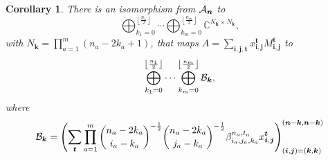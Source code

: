 \documentclass[final,onecolumn]{IEEEtran}
\newtheorem{corollaryenv}[definitionenv]{Corollary}
\newenvironment{corollary}{\begin{corollaryenv}\rm}{\end{corollaryenv}}
\theoremstyle{definition}
\newcommand{\bmi}{{\bm i}}
\newcommand{\bmj}{{\bm j}}
\newcommand{\bmn}{{\bm n}}
\newcommand{\bmk}{{\bm k}}
\newcommand{\bmt}{{\bm t}}
\begin{document}
	
\begin{corollary} \label{cor:blo_g}
	There is an isomorphism from ${\cal A}_{\bmn}$  to
	\begin{equation*}
		\bigoplus_{k_{1} = 0}^{\left\lfloor \frac{n_{1}}{2} \right\rfloor} \cdots \bigoplus_{k_{m} = 0}^{\left\lfloor \frac{n_{m}}{2} \right\rfloor} \mathbb{C}^{N_{\bmk} \times N_{\bmk}}, 
	\end{equation*}
	with $N_{\bmk} = \prod_{a = 1}^{m} (n_{a}-2k_{a}+1)$, that maps
	$A = \sum_{\bmi, \bmj, \bmt}x_{\bmi, \bmj}^{\bmt} M_{\bmi, \bmj}^{\bmt}$ to
	\begin{equation*}
		\bigoplus_{k_{1} = 0}^{\left\lfloor \frac{n_{1}}{2} \right\rfloor} \cdots \bigoplus_{k_{m} = 0}^{\left\lfloor \frac{n_{m}}{2} \right\rfloor} {\cal B}_{\bmk}, 
	\end{equation*}
	where
	\begin{equation*}
		\begin{aligned}
			{\cal B}_{\bmk} = \left( \sum_{\bmt} \prod_{a = 1}^{m} \binom{n_{a}-2k_{a}}{i_{a}-k_{a}}^{-\frac{1}{2}} \binom{n_{a}-2k_{a}}{j_{a}-k_{a}}^{-\frac{1}{2}}  \beta_{i_{a}, j_{a}, k_{a}}^{n_{a}, t_{a}} x_{\bmi, \bmj}^{\bmt} \right)_{(\bmi, \bmj) = (\bmk, \bmk)}^{(\bmn-\bmk, \bmn-\bmk)}
		\end{aligned} 
	\end{equation*}
\end{corollary}
	
\end{document}
